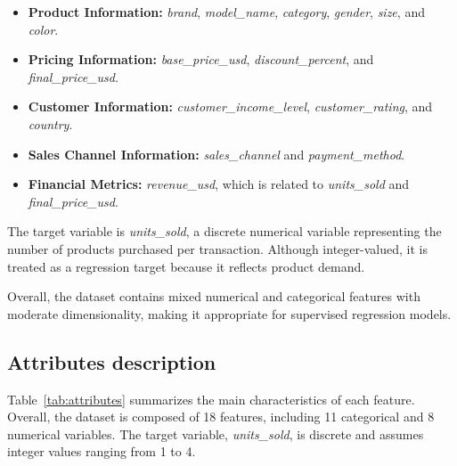 \documentclass[12pt]{article}
\begin{document}
\begin{itemize}
    \item \textbf{Product Information:} \textit{brand}, \textit{model\_name}, \textit{category}, \textit{gender}, \textit{size}, and \textit{color}.
    
    \item \textbf{Pricing Information:} \textit{base\_price\_usd}, \textit{discount\_percent}, and \textit{final\_price\_usd}.
    
    \item \textbf{Customer Information:} \textit{customer\_income\_level}, \textit{customer\_rating}, and \textit{country}.
    
    \item \textbf{Sales Channel Information:} \textit{sales\_channel} and \textit{payment\_method}.
    
    \item \textbf{Financial Metrics:} \textit{revenue\_usd}, which is related to \textit{units\_sold} and \textit{final\_price\_usd}.
\end{itemize}

The target variable is \textit{units\_sold}, a discrete numerical variable representing the number of products purchased per transaction. Although integer-valued, it is treated as a regression target because it reflects product demand.

Overall, the dataset contains mixed numerical and categorical features with moderate dimensionality, making it appropriate for supervised regression models.



\subsection{Attributes description}

Table~\ref{tab:attributes} summarizes the main characteristics of each feature. Overall, the dataset is composed of 18 features, including 11 categorical and 8 numerical variables. The target variable, \textit{units\_sold}, is discrete and assumes integer values ranging from 1 to 4.
\end{document}
